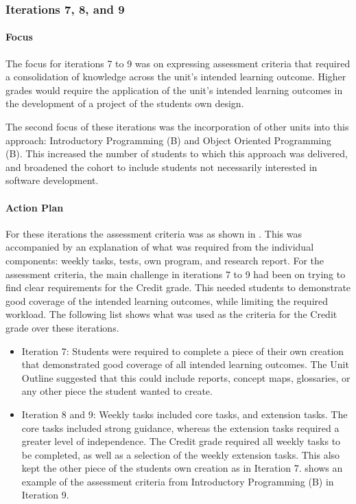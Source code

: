 \subsubsection{Iterations 7, 8, and 9} %
\label{sub:iterations_7_to_9}

\paragraph{Focus} %

The focus for iterations 7 to 9 was on expressing assessment criteria that required a consolidation of knowledge across the unit's intended learning outcome. Higher grades would require the application of the unit's intended learning outcomes in the development of a project of the students own design. 

The second focus of these iterations was the incorporation of other units into this approach: Introductory Programming (B) and Object Oriented Programming (B). This increased the number of students to which this approach was delivered, and broadened the cohort to include students not necessarily interested in software development.

\paragraph{Action Plan} %

For these iterations the assessment criteria was as shown in . This was accompanied by an explanation of what was required from the individual components: weekly tasks, tests, own program, and research report. For the assessment criteria, the main challenge in iterations 7 to 9 had been on trying to find clear requirements for the Credit grade. This needed students to demonstrate good coverage of the intended learning outcomes, while limiting the required workload. The following list shows what was used as the criteria for the Credit grade over these iterations.

\begin{itemize}[noitemsep,nolistsep]
  \item Iteration 7: Students were required to complete a piece of their own creation that demonstrated good coverage of all intended learning outcomes. The Unit Outline suggested that this could include reports, concept maps, glossaries, or any other piece the student wanted to create.
  \item Iteration 8 and 9: Weekly tasks included core tasks, and extension tasks. The core tasks included strong guidance, whereas the extension tasks required a greater level of independence. The Credit grade required all weekly tasks to be completed, as well as a selection of the weekly extension tasks. This also kept the other piece of the students own creation as in Iteration 7.  shows an example of the assessment criteria from Introductory Programming (B) in Iteration 9.
\end{itemize}

